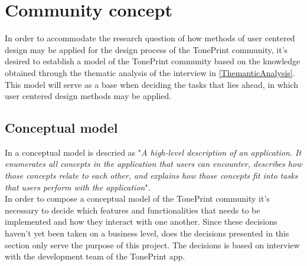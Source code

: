 \chapter{Community concept}
\label{CommunityConcept}
In order to accommodate the research question of how methods of user centered design may be applied for the design process of the TonePrint community, it's desired to establish a model of the TonePrint community based on the knowledge obtained through the thematic analysis of the interview in \autoref{ThemanticAnalysis}. This model will serve as a base when deciding the tasks that lies ahead, in which user centered design methods may be applied.

\section{Conceptual model}
\label{ConceptualModel}
In \parencite[17]{PDF:Henderson2012} a conceptual model is descried  as "\textit{A high-level description of an application. It enumerates all concepts in the application that users can encounter, describes how those concepts relate to each other, and explains how those concepts fit into tasks that users perform with the application}".\\
In order to compose a conceptual model of the TonePrint community it's necessary to decide which features and functionalities that needs to be implemented and how they interact with one another. Since these decisions haven't yet been taken on a business level, does the decisions presented in this section only serve the purpose of this project. The decisions is based on interview with the development team of the TonePrint app.

